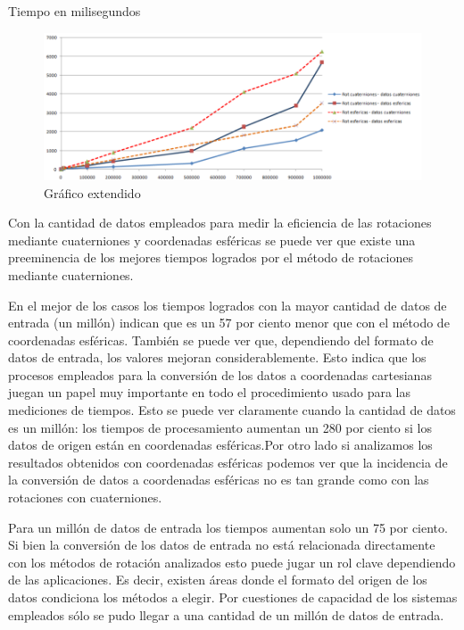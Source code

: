 \documentclass[spanish]{article}
\begin{document}
Tiempo en milisegundos\\

\begin{figure}[H]
  \centering
    \includegraphics[scale=0.75]{resultgrafico.png}
  \caption{Gráfico extendido}
  \label{fig:ejemplo}
\end{figure}

  
  Con la cantidad de datos empleados para medir la eficiencia de las rotaciones mediante cuaterniones y coordenadas esféricas se puede ver que existe una preeminencia de los mejores tiempos logrados por el método de rotaciones mediante cuaterniones. 
  
  En el mejor de los casos los tiempos logrados con la mayor cantidad de datos de entrada (un millón) indican que es un 57 por ciento menor que con el método de coordenadas esféricas. También se puede ver que, dependiendo del formato de datos de entrada, los valores mejoran considerablemente. Esto indica que los procesos empleados para la conversión de los datos a coordenadas cartesianas juegan un papel muy importante en todo el procedimiento usado para las mediciones de tiempos. Esto se puede ver claramente cuando la cantidad de datos es un millón: los tiempos de procesamiento aumentan un 280 por ciento si los datos de origen están en coordenadas esféricas.Por otro lado si analizamos los resultados obtenidos con coordenadas esféricas podemos ver que la incidencia de la conversión de datos a coordenadas esféricas no es tan grande como con las rotaciones con cuaterniones. 
  
  Para un millón de datos de entrada los tiempos aumentan solo un 75 por ciento.
  Si bien la conversión de los datos de entrada no está relacionada directamente con los métodos de rotación analizados esto puede jugar un rol clave dependiendo de las aplicaciones. Es decir, existen áreas donde el formato del origen de los datos condiciona los métodos a elegir. Por cuestiones de capacidad de los sistemas empleados sólo se pudo llegar a una cantidad de un millón de datos de entrada. 
  
\end{document}
